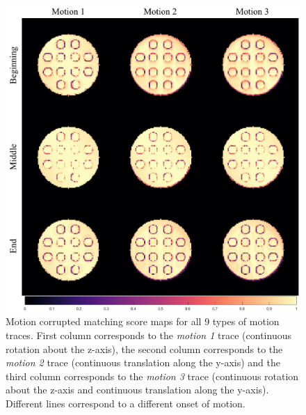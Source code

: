 \begin{figure}[ht]
    \centering
    \includegraphics[width=1\textwidth]{images/mrf/scoremapsmotion}
    \caption{Motion corrupted matching score maps for all 9 types of motion traces. First column corresponds to the \textit{motion 1} trace (continuous rotation about the z-axis), the second column corresponds to the \textit{motion 2} trace (continuous translation along the y-axis) and the third column corresponds to the \textit{motion 3} trace (continuous rotation about the z-axis and continuous translation along the y-axis). Different lines correspond to a different onset of motion.}
    \label{fig:appendixscoremapsmotion}
\end{figure}

